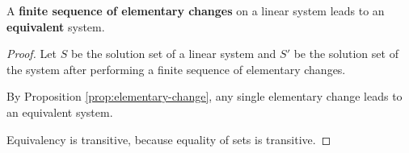 \begin{theorem}\label{thm:equivalent-systems}
    A \textbf{finite sequence of elementary changes} on a linear system leads to an \textbf{equivalent} system.
\end{theorem}
\begin{proof}
    Let $S$ be the solution set of a linear system and $S'$ be the solution set of the system after performing a finite sequence of elementary changes.

    By Proposition \ref{prop:elementary-change}, any single elementary change leads to an equivalent system.

    Equivalency is transitive, because equality of sets is transitive.
\end{proof}